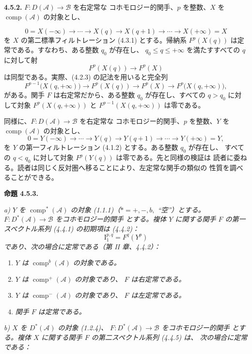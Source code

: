 \clearpage
{}%
\begingroup\small\setlength{\parskip}{0pt}\setlength{\emergencystretch}{1.5em}
\setlength{\abovedisplayskip}{4pt plus 2pt minus 2pt}%
\setlength{\belowdisplayskip}{4pt plus 2pt minus 2pt}%

\noindent\textbf{4.5.2.}\quad
$F\colon D(\mathcal A)\longrightarrow\mathcal B$ を右定常な
コホモロジー的関手、$p$ を整数、$X$ を
$\operatorname{comp}(\mathcal A)$ の対象とし、

\[
0=X(-\infty)\longrightarrow\cdots\longrightarrow X(q)
\longrightarrow X(q+1)\longrightarrow\cdots
\longrightarrow X(+\infty)=X
\]
を $X$ の第二標準フィルトレーション (4.3.1) とする。帰納系
$F^p(X(q))$ は定常である。すなわち、ある整数 $q_0$ が存在し、
$q_0\leq q\leq+\infty$ を満たすすべての $q$ に対して射
\[
F^p(X(q))\longrightarrow F^p(X)
\]
は同型である。実際、(4.2.3) の記法を用いると完全列
\[
F^{p-1}\bigl(X(q,+\infty)\bigr)\longrightarrow F^p(X(q))
\longrightarrow F^p(X)\longrightarrow F^p\bigl(X(q,+\infty)\bigr),
\]
がある。関手 $F$ は右定常だから、ある整数 $q_0$ が存在し、すべての
$q>q_0$ に対して対象 $F^p(X(q,+\infty))$ と
$F^{p-1}(X(q,+\infty))$ は零である。

同様に、$F\colon D(\mathcal A)\longrightarrow\mathcal B$ を右定常な
コホモロジー的関手、$p$ を整数、$Y$ を
$\operatorname{comp}(\mathcal A)$ の対象とし、
\[
0=Y(-\infty)\longrightarrow\cdots\longrightarrow Y(q)
\longrightarrow Y(q+1)\longrightarrow\cdots
\longrightarrow Y(+\infty)=Y,
\]
を $Y$ の第一フィルトレーション (4.1.2) とする。ある整数 $q_0$ が存在し、
すべての $q<q_0$ に対して対象 $F^p(Y(q))$ は零である。先と同様の検証は
読者に委ねる。読者は同じく反対圏へ移ることにより、左定常な関手の類似の
性質を調べることができる。

\medskip\noindent\textbf{命題 4.5.3.}\quad

\noindent\textit{a) $Y$ を $\operatorname{comp}^{*}(\mathcal A)$ の対象
(1.1.1)（$*=+,-,b,{}$ ``空''）とする。
$F\colon D^*(\mathcal A)\longrightarrow\mathcal B$ をコホモロジー的関手
とする。複体 $Y$ に関する関手 $F$ の第一スペクトル系列 (4.4.1) の初期項は
(4.4.2)：}
\[
\textit{$\mathrm{I}_1^{p,q}=F^q(Y^p)$}
\]
\textit{であり、次の場合に定常である（第 II 章、4.4.2）：}

\begin{enumerate}
\item[1)] \textit{$Y$ は $\operatorname{comp}^{b}(\mathcal A)$ の対象である。}
\item[2)] \textit{$Y$ は $\operatorname{comp}^{+}(\mathcal A)$ の対象であり、
$F$ は右定常である。}
\item[3)] \textit{$Y$ は $\operatorname{comp}^{-}(\mathcal A)$ の対象であり、
$F$ は左定常である。}
\item[4)] \textit{関手 $F$ は定常である。}
\end{enumerate}

\noindent\textit{b) $X$ を $D^*(\mathcal A)$ の対象 (1.2.4)、
$F\colon D^*(\mathcal A)\longrightarrow\mathcal B$ をコホモロジー的関手
とする。複体 $X$ に関する関手 $F$ の第二スペクトル系列 (4.4.5) は、
次の場合に定常である：}
\endgroup
